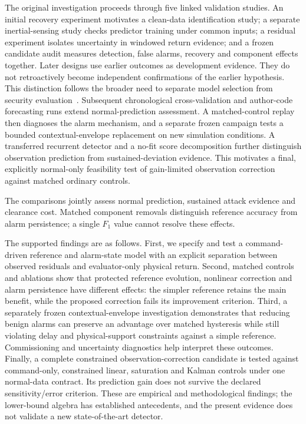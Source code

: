 \documentclass[11pt,twocolumn]{article}
\begin{document}
The original investigation proceeds through five linked validation studies. An initial recovery experiment motivates a clean-data identification study; a separate inertial-sensing study checks predictor training under common inputs; a residual experiment isolates uncertainty in windowed return evidence; and a frozen candidate audit measures detection, false alarms, recovery and component effects together. Later designs use earlier outcomes as development evidence. They do not retroactively become independent confirmations of the earlier hypothesis. This distinction follows the broader need to separate model selection from security evaluation~\cite{arp}. Subsequent chronological cross-validation and author-code forecasting runs extend normal-prediction assessment. A matched-control replay then diagnoses the alarm mechanism, and a separate frozen campaign tests a bounded contextual-envelope replacement on new simulation conditions. A transferred recurrent detector and a no-fit score decomposition further distinguish observation prediction from sustained-deviation evidence. This motivates a final, explicitly normal-only feasibility test of gain-limited observation correction against matched ordinary controls.

The comparisons jointly assess normal prediction, sustained attack evidence and clearance cost. Matched component removals distinguish reference accuracy from alarm persistence; a single $F_1$ value cannot resolve these effects.

The supported findings are as follows. First, we specify and test a command-driven reference and alarm-state model with an explicit separation between observed residuals and evaluator-only physical return. Second, matched controls and ablations show that protected reference evolution, nonlinear correction and alarm persistence have different effects: the simpler reference retains the main benefit, while the proposed correction fails its improvement criterion. Third, a separately frozen contextual-envelope investigation demonstrates that reducing benign alarms can preserve an advantage over matched hysteresis while still violating delay and physical-support constraints against a simple reference. Commissioning and uncertainty diagnostics help interpret these outcomes. Finally, a complete constrained observation-correction candidate is tested against command-only, constrained linear, saturation and Kalman controls under one normal-data contract. Its prediction gain does not survive the declared sensitivity/error criterion. These are empirical and methodological findings; the lower-bound algebra has established antecedents, and the present evidence does not validate a new state-of-the-art detector.
\end{document}
